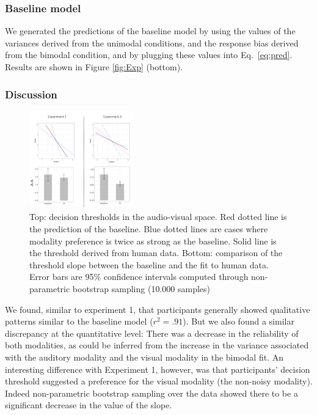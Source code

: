 \documentclass[10pt,letterpaper]{article}
\begin{document}
\subsubsection{Baseline model}

We generated the predictions of the baseline model by using the values of the variances derived from the unimodal conditions, and the response bias derived from the bimodal condition, and by plugging these values into Eq.~\ref{eq:pred}.
Results are shown in Figure \ref{fig:Exp} (bottom).

\subsubsection{Discussion}

\begin{figure}[h]
\centering
\includegraphics[width=0.4\textwidth]{preference.png}
\caption{Top: decision thresholds in the audio-visual space. Red dotted line is the prediction of the baseline. Blue dotted lines are cases where modality preference is twice as strong as the baseline. Solid line is the threshold derived from human data. Bottom: comparison of the threshold slope between the baseline and the fit to human data. Error bars are 95\% confidence intervals computed through non-parametric bootstrap sampling (10.000 samples)}
\label{fig:pref}
\end{figure}

We found, similar to experiment 1, that participants generally showed qualitative patterns similar to the baseline model ($r^2 = .91$). But we also found a similar discrepancy at the quantitative level: There was a decrease in the reliability of both modalities, as could be inferred from the increase in the variance associated with the auditory modality and the visual modality in the bimodal fit. An interesting difference with Experiment 1, however, was that participants' decision threshold suggested a preference for the visual modality (the non-noisy modality). Indeed non-parametric bootstrap sampling over the data showed there to be a significant decrease in the value of the slope.
\end{document}
